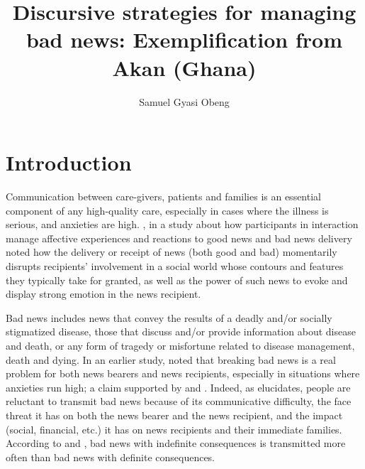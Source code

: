 \documentclass[output=paper,colorlinks,citecolor=brown]{langscibook}
\author{Samuel Gyasi Obeng
\affiliation{Indiana University}}
\title[Discursive strategies for managing bad news]
      {Discursive strategies for managing bad news: Exemplification from Akan (Ghana)}
\begin{document}
\maketitle

\section{Introduction}\label{sec:obeng:1}

Communication between care-givers, patients and families is an essential component of any high-quality care, especially in cases where the illness is serious, and anxieties are high. \citet{MaynardFreese2012}, in a study about how participants in interaction manage affective experiences and reactions to good news and bad news delivery noted how the delivery or receipt of news (both good and bad) momentarily disrupts recipients’ involvement in a social world whose contours and features they typically take for granted, as well as the power of such news to evoke and display strong emotion in the news recipient. 

Bad news includes news that convey the results of a deadly and/or socially stigmatized disease, those that discuss and/or provide information about disease and death, or any form of tragedy or misfortune related to disease management, death and dying. In an earlier study, \citet{Maynard2003} noted that breaking bad news is a real problem for both news bearers and news recipients, especially in situations where anxieties run high; a claim supported by \citet{FallowfieldJenkins2004} and \citet{BrownEtAl2009}. Indeed, as \citet{Maynard2003} elucidates, people are reluctant to transmit bad news because of its communicative difficulty, the face threat it has on both the news bearer and the news recipient, and the impact (social, financial, etc.) it has on news recipients and their immediate families. According to \citet{TesserRosen1975} and \citet{WeenigEtAl2014, WeenigEtAl2001}, bad news with indefinite consequences is transmitted more often than bad news with definite consequences.
\end{document}
